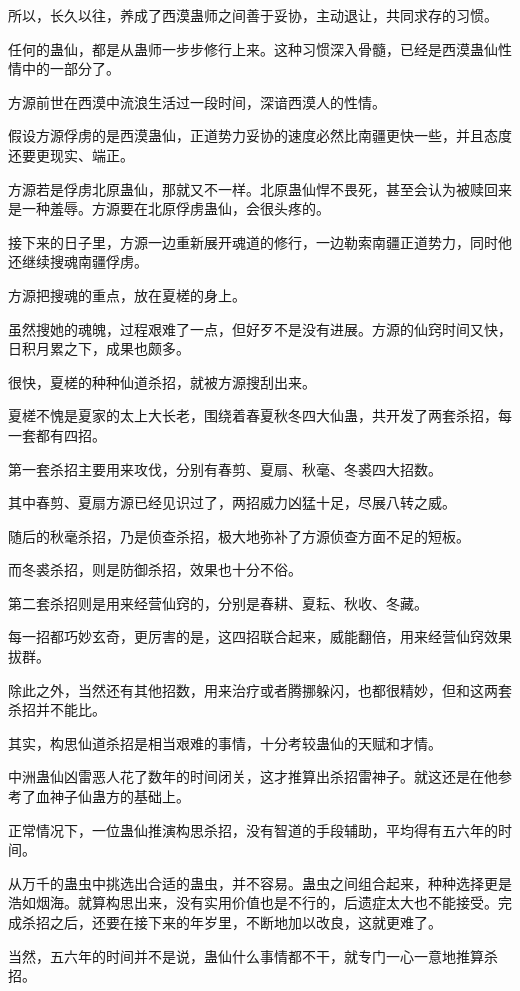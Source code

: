\begin{this_body}
所以，长久以往，养成了西漠蛊师之间善于妥协，主动退让，共同求存的习惯。

任何的蛊仙，都是从蛊师一步步修行上来。这种习惯深入骨髓，已经是西漠蛊仙性情中的一部分了。

方源前世在西漠中流浪生活过一段时间，深谙西漠人的性情。

假设方源俘虏的是西漠蛊仙，正道势力妥协的速度必然比南疆更快一些，并且态度还要更现实、端正。

方源若是俘虏北原蛊仙，那就又不一样。北原蛊仙悍不畏死，甚至会认为被赎回来是一种羞辱。方源要在北原俘虏蛊仙，会很头疼的。

接下来的日子里，方源一边重新展开魂道的修行，一边勒索南疆正道势力，同时他还继续搜魂南疆俘虏。

方源把搜魂的重点，放在夏槎的身上。

虽然搜她的魂魄，过程艰难了一点，但好歹不是没有进展。方源的仙窍时间又快，日积月累之下，成果也颇多。

很快，夏槎的种种仙道杀招，就被方源搜刮出来。

夏槎不愧是夏家的太上大长老，围绕着春夏秋冬四大仙蛊，共开发了两套杀招，每一套都有四招。

第一套杀招主要用来攻伐，分别有春剪、夏扇、秋毫、冬裘四大招数。

其中春剪、夏扇方源已经见识过了，两招威力凶猛十足，尽展八转之威。

随后的秋毫杀招，乃是侦查杀招，极大地弥补了方源侦查方面不足的短板。

而冬裘杀招，则是防御杀招，效果也十分不俗。

第二套杀招则是用来经营仙窍的，分别是春耕、夏耘、秋收、冬藏。

每一招都巧妙玄奇，更厉害的是，这四招联合起来，威能翻倍，用来经营仙窍效果拔群。

除此之外，当然还有其他招数，用来治疗或者腾挪躲闪，也都很精妙，但和这两套杀招并不能比。

其实，构思仙道杀招是相当艰难的事情，十分考较蛊仙的天赋和才情。

中洲蛊仙凶雷恶人花了数年的时间闭关，这才推算出杀招雷神子。就这还是在他参考了血神子仙蛊方的基础上。

正常情况下，一位蛊仙推演构思杀招，没有智道的手段辅助，平均得有五六年的时间。

从万千的蛊虫中挑选出合适的蛊虫，并不容易。蛊虫之间组合起来，种种选择更是浩如烟海。就算构思出来，没有实用价值也是不行的，后遗症太大也不能接受。完成杀招之后，还要在接下来的年岁里，不断地加以改良，这就更难了。

当然，五六年的时间并不是说，蛊仙什么事情都不干，就专门一心一意地推算杀招。


\end{this_body}
